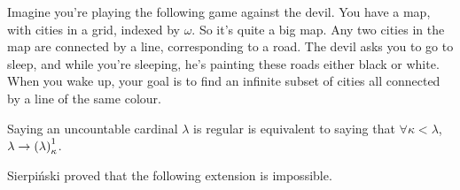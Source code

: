 Imagine you're playing the following game against the devil. You have a map, with cities in a grid, indexed by $\omega$. So it's quite a big map. Any two cities in the map are connected by a line, corresponding to a road. The devil asks you to go to sleep, and while you're sleeping, he's painting these roads either black or white. When you wake up, your goal is to find an infinite subset of cities all connected by a line of the same colour.


\begin{remark}
    Saying an uncountable cardinal $\lambda$ is regular is equivalent to saying that $\forall \kappa<\lambda$, $\lambda \to \left( \lambda \right)_{\kappa}^{1}$.
\end{remark}

Sierpiński proved that the following extension is impossible.

